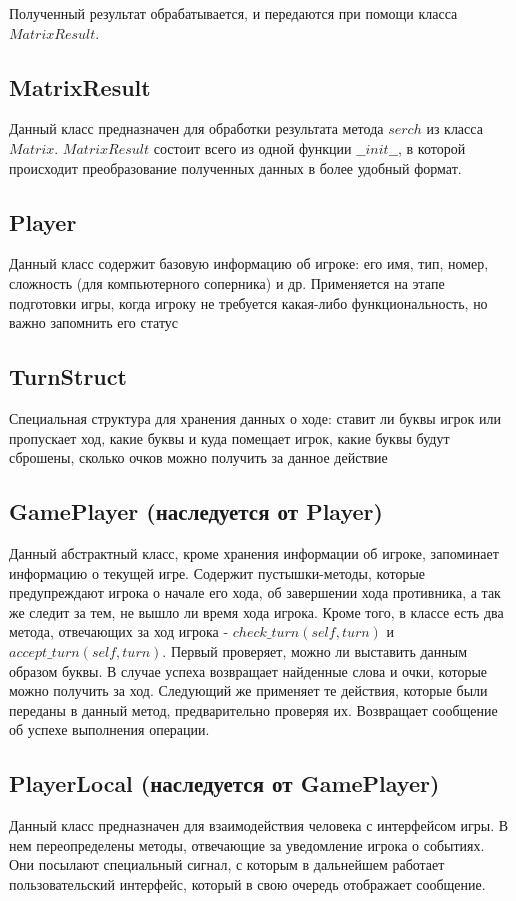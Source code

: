 \documentclass[a4paper,14pt]{article}
\begin{document}
	Полученный результат обрабатывается, и передаются при помощи класса $MatrixResult$.
	
	\subsection{MatrixResult}
	Данный класс предназначен для обработки результата метода $serch$ из класса $Matrix$. $MatrixResult$ состоит всего из одной функции $\_\_init\_\_$, в которой происходит преобразование полученных данных в более удобный формат. 
	
	\subsection{Player}
	Данный класс содержит базовую информацию об игроке: его имя, тип, номер, сложность (для компьютерного соперника) и др. Применяется на этапе подготовки игры, когда игроку не требуется какая-либо функциональность, но важно запомнить его статус
	
	\subsection{TurnStruct}
	Специальная структура для хранения данных о ходе: ставит ли буквы игрок или пропускает ход, какие буквы и куда помещает игрок, какие буквы будут сброшены, сколько очков можно получить за данное действие
	
	\subsection[GamePlayer]{GamePlayer (наследуется от Player)}
	Данный абстрактный класс, кроме хранения информации об игроке, запоминает информацию о текущей игре. Содержит пустышки-методы, которые предупреждают игрока о начале его хода, об завершении хода противника, а так же следит за тем, не вышло ли время хода игрока. Кроме того, в классе есть два метода, отвечающих за ход игрока - $check\_turn(self, turn)$ и $accept\_turn(self, turn)$. Первый проверяет, можно ли выставить данным образом буквы. В случае успеха возвращает найденные слова и очки, которые можно получить за ход. Следующий же применяет те действия, которые были переданы в данный метод, предварительно проверяя их. Возвращает сообщение об успехе выполнения операции.
	
	\subsection[PlayerLocal]{PlayerLocal (наследуется от GamePlayer)}
	Данный класс предназначен для взаимодействия человека с интерфейсом игры. В нем переопределены методы, отвечающие за уведомление игрока о событиях. Они посылают специальный сигнал, с которым в дальнейшем работает пользовательский интерфейс, который в свою очередь отображает сообщение.
	
\end{document}
